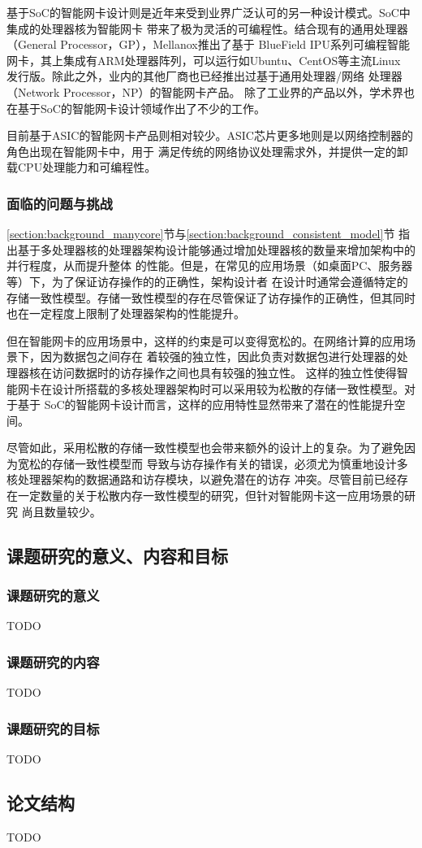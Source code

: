 基于SoC的智能网卡设计则是近年来受到业界广泛认可的另一种设计模式。SoC中集成的处理器核为智能网卡
带来了极为灵活的可编程性。结合现有的通用处理器（General Processor，GP），Mellanox推出了基于
BlueField IPU系列可编程智能网卡，其上集成有ARM处理器阵列，可以运行如Ubuntu、CentOS等主流Linux
发行版\cite{mellanox2020bluefield}。除此之外，业内的其他厂商也已经推出过基于通用处理器/网络
处理器（Network Processor，NP）的智能网卡产品\cite{broadcom2020stingray,annapurna2020announce}。
除了工业界的产品以外，学术界也在基于SoC的智能网卡设计领域作出了不少的工作\cite{di2020pspin}。

目前基于ASIC的智能网卡产品则相对较少。ASIC芯片更多地则是以网络控制器的角色出现在智能网卡中，用于
满足传统的网络协议处理需求外，并提供一定的卸载CPU处理能力和可编程性\cite{maxiaoxiao2022survey}。

\subsubsection{面临的问题与挑战}

\ref{section:background_manycore}节与\ref{section:background_consistent_model}节
指出基于多处理器核的处理器架构设计能够通过增加处理器核的数量来增加架构中的并行程度，从而提升整体
的性能。但是，在常见的应用场景（如桌面PC、服务器等）下，为了保证访存操作的的正确性，架构设计者
在设计时通常会遵循特定的存储一致性模型。存储一致性模型的存在尽管保证了访存操作的正确性，但其同时
也在一定程度上限制了处理器架构的性能提升。

但在智能网卡的应用场景中，这样的约束是可以变得宽松的。在网络计算的应用场景下，因为数据包之间存在
着较强的独立性，因此负责对数据包进行处理器的处理器核在访问数据时的访存操作之间也具有较强的独立性。
这样的独立性使得智能网卡在设计所搭载的多核处理器架构时可以采用较为松散的存储一致性模型。对于基于
SoC的智能网卡设计而言，这样的应用特性显然带来了潜在的性能提升空间。

尽管如此，采用松散的存储一致性模型也会带来额外的设计上的复杂。为了避免因为宽松的存储一致性模型而
导致与访存操作有关的错误，必须尤为慎重地设计多核处理器架构的数据通路和访存模块，以避免潜在的访存
冲突。尽管目前已经存在一定数量的关于松散内存一致性模型的研究，但针对智能网卡这一应用场景的研究
尚且数量较少。

\subsection{课题研究的意义、内容和目标}

\subsubsection{课题研究的意义}

TODO

\subsubsection{课题研究的内容}

TODO

\subsubsection{课题研究的目标}

TODO

\subsection{论文结构}

TODO
